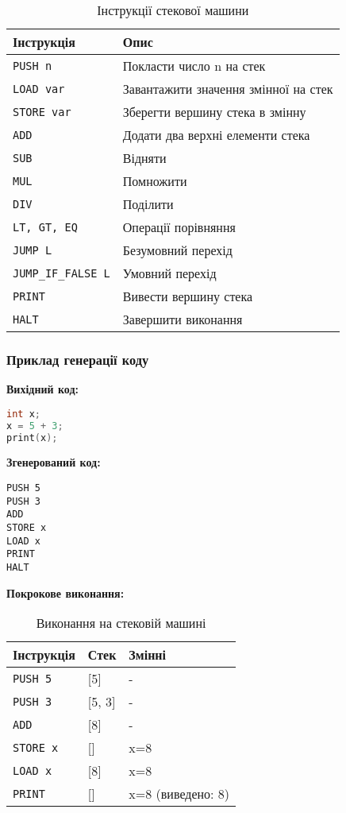\documentclass[12pt,a4paper]{article}
\begin{document}
\begin{table}[h]
\centering
\begin{tabular}{|l|l|}
\hline
\textbf{Інструкція} & \textbf{Опис} \\ \hline
\texttt{PUSH n} & Покласти число n на стек \\ \hline
\texttt{LOAD var} & Завантажити значення змінної на стек \\ \hline
\texttt{STORE var} & Зберегти вершину стека в змінну \\ \hline
\texttt{ADD} & Додати два верхні елементи стека \\ \hline
\texttt{SUB} & Відняти \\ \hline
\texttt{MUL} & Помножити \\ \hline
\texttt{DIV} & Поділити \\ \hline
\texttt{LT, GT, EQ} & Операції порівняння \\ \hline
\texttt{JUMP L} & Безумовний перехід \\ \hline
\texttt{JUMP\_IF\_FALSE L} & Умовний перехід \\ \hline
\texttt{PRINT} & Вивести вершину стека \\ \hline
\texttt{HALT} & Завершити виконання \\ \hline
\end{tabular}
\caption{Інструкції стекової машини}
\end{table}

\subsubsection{Приклад генерації коду}

\textbf{Вихідний код:}
\begin{lstlisting}[language=C]
int x;
x = 5 + 3;
print(x);
\end{lstlisting}

\textbf{Згенерований код:}
\begin{verbatim}
PUSH 5
PUSH 3
ADD
STORE x
LOAD x
PRINT
HALT
\end{verbatim}

\textbf{Покрокове виконання:}

\begin{table}[h]
\centering
\small
\begin{tabular}{|l|l|l|}
\hline
\textbf{Інструкція} & \textbf{Стек} & \textbf{Змінні} \\ \hline
\texttt{PUSH 5} & [5] & - \\ \hline
\texttt{PUSH 3} & [5, 3] & - \\ \hline
\texttt{ADD} & [8] & - \\ \hline
\texttt{STORE x} & [] & x=8 \\ \hline
\texttt{LOAD x} & [8] & x=8 \\ \hline
\texttt{PRINT} & [] & x=8 (виведено: 8) \\ \hline
\end{tabular}
\caption{Виконання на стековій машині}
\end{table}
\end{document}
